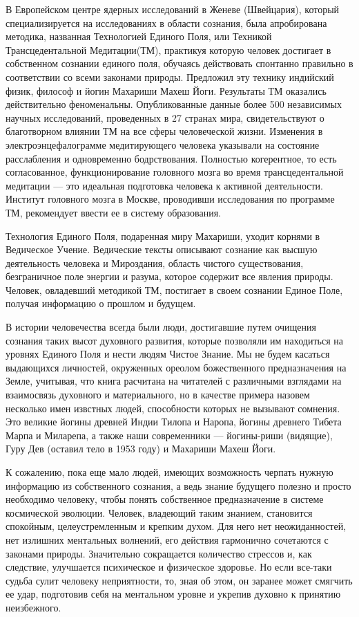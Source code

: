В Европейском центре ядерных исследований в Женеве (Швейцария), который специализируется на исследованиях в области сознания, была апробирована методика, названная Технологией Единого Поля, или Техникой Трансцедентальной Медитации(ТМ), практикуя которую человек достигает в собственном сознании единого поля, обучаясь действовать спонтанно правильно в соответствии со всеми законами природы. Предложил эту технику индийский физик, философ и йогин Махариши Махеш Йоги. Результаты ТМ оказались действительно феноменальны. Опубликованные данные более 500 независимых научных исследований, проведенных в 27 странах мира, свидетельствуют о благотворном влиянии ТМ на все сферы человеческой жизни. Изменения в электроэнцефалограмме медитирующего человека указывали на состояние расслабления и одновременно бодрствования. Полностью когерентное, то есть согласованное, функционирование головного мозга во время трансцедентальной медитации --- это идеальная подготовка человека к активной деятельности. Институт головного мозга в Москве, проводивши исследования по программе ТМ, рекомендует ввести ее в систему образования.

Технология Единого Поля, подаренная миру Махариши, уходит корнями в Ведическое Учение. Ведические тексты описывают сознание как высшую деятельность человека и Мироздания, область чистого существования, безграничное поле энергии и разума, которое содержит все явления природы. Человек, овладевший методикой ТМ, постигает в своем сознании Единое Поле, получая информацию о прошлом и будущем.

В истории человечества всегда были люди, достигавшие путем очищения сознания таких высот духовного развития, которые позволяли им находиться на уровнях Единого Поля и нести людям Чистое Знание. Мы не будем касаться выдающихся личностей, окруженных ореолом божественного предназначения на Земле, учитывая, что книга расчитана на читателей с различными взглядами на взаимосвязь духовного и материального, но в качестве примера назовем несколько имен извстных людей, способности которых не вызывают сомнения. Это великие йогины древней Индии Тилопа и Наропа, йогины древнего Тибета Марпа и Миларепа, а также наши современники --- йогины-риши (видящие), Гуру Дев (оставил тело в 1953 году) и Махариши Махеш Йоги.

К сожалению, пока еще мало людей, имеющих возможность черпать нужную информацию из собственного сознания, а ведь знание будущего полезно и просто необходимо человеку, чтобы понять собственное предназначение в системе космической эволюции. Человек, владеющий таким знанием, становится спокойным, целеустремленным и крепким духом. Для него нет неожиданностей, нет излишних ментальных волнений, его действия гармонично сочетаются с законами природы. Значительно сокращается количество стрессов и, как следствие, улучшается психическое и физическое здоровье. Но если все-таки судьба сулит человеку неприятности, то, зная об этом, он заранее может смягчить ее удар, подготовив себя на ментальном уровне и укрепив духовно к принятию неизбежного.


